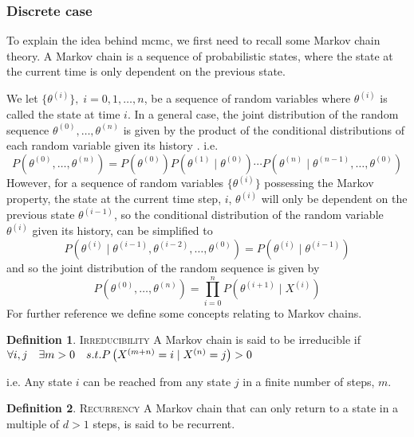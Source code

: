 \documentclass{article}
\theoremstyle{definition}
\newtheorem{definition}{Definition}[section]
\begin{document}
\subsubsection{Discrete case}\label{subsec:markov_discrete}
To explain the idea behind \gls{mcmc}, we first need to recall some Markov chain theory. 
A Markov chain is a sequence of probabilistic states, where the state at the current time is only dependent on the previous state. 
\par
We let $\{\theta^{\left(i\right)}\}, \; i = 0, 1, \ldots, n$, be a sequence of random variables where $\theta^{\left(i\right)}$ is called the state at time $i$. In a general case, the joint distribution of the random sequence $\theta^{(0)}, \ldots, \theta^{(n)}$ is given by the product of the conditional distributions of each random variable given its history \cite{CS}.  i.e. 
\begin{equation*}
    P\left(\theta^{(0)}, \ldots, \theta^{(n)}\right) = P\left(\theta^{(0)}\right) P\left(\theta^{(1)}\mid \theta^{(0)}\right)  \cdots  P\left(\theta^{(n)}\mid \theta^{(n-1 )},\ldots, \theta^{(0)}\right)
\end{equation*}
However, for a sequence of random variables $\{\theta^{(i)}\}$ possessing the Markov property, the state at the current time step,  $i$, $\theta^{(i)}$ will only be dependent on the previous state $\theta^{(i-1)}$, so the conditional distribution of the random variable $\theta^{(i)}$ given its history, can be simplified to $$P\left(\theta^{(i)}\mid \theta^{(i-1)}, \theta^{(i-2)}, \ldots, \theta^{(0)}\right) = P\left(\theta^{(i)}\mid \theta^{(i-1)}\right)$$
and so the joint distribution of the random sequence is given by 
\begin{equation*}
    P\left(\theta^{(0)}, \ldots, \theta^{(n)}\right) = \prod_{i = 0}^n P\left(\theta^{(i+1)}\mid X^{(i)}\right)
\end{equation*}
For further reference we define some concepts relating to Markov chains.
\theoremstyle{definition}
\begin{definition}{\textsc{Irreducibility}} A Markov chain is said to be irreducible if $\forall i, j \quad \exists m > 0 \quad s.t. \\ P\left(X^{(m+n)} = i\mid X^{(n)} = j \right) > 0$
\end{definition}
i.e. Any state $i$ can be reached from any state $j$ in a finite number of steps, $m$.
\theoremstyle{definition}
\begin{definition}{\textsc{Recurrency}} 
A Markov chain that can only return to a state in a multiple of $d>1$ steps, is said to be recurrent. 
\end{definition}
\end{document}
